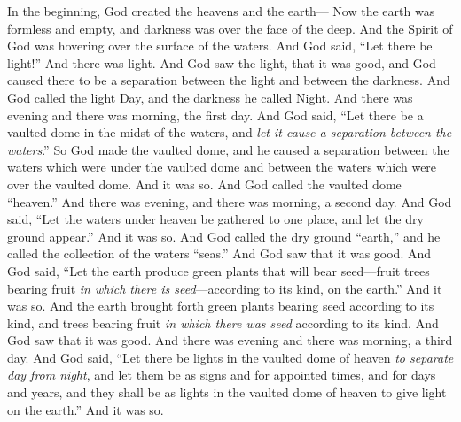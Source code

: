 
\begin{biblechapter} %
 In the beginning, God created the heavens and the earth—
\verse Now the earth was formless and empty, and darkness was over the face of the deep. And the Spirit of God was hovering over the surface of the waters.
\verse And God said, “Let there be light!” And there was light.
\verse And God saw the light, that it was good, and God caused there to be a separation between the light and between the darkness.
\verse And God called the light Day, and the darkness he called Night. And there was evening and there was morning, the first day.
\verse And God said, “Let there be a vaulted dome in the midst of the waters, and \textit{let it cause a separation between the waters}.”
\verse So God made the vaulted dome, and he caused a separation between the waters which were under the vaulted dome and between the waters which were over the vaulted dome. And it was so.
\verse And God called the vaulted dome “heaven.” And there was evening, and there was morning, a second day.
\verse And God said, “Let the waters under heaven be gathered to one place, and let the dry ground appear.” And it was so.
\verse And God called the dry ground “earth,” and he called the collection of the waters “seas.” And God saw that it was good.
\verse And God said, “Let the earth produce green plants that will bear seed—fruit trees bearing fruit \textit{in which there is seed}—according to its kind, on the earth.” And it was so.
\verse And the earth brought forth green plants bearing seed according to its kind, and trees bearing fruit \textit{in which there was seed} according to its kind. And God saw that it was good.
\verse And there was evening and there was morning, a third day.
\verse And God said, “Let there be lights in the vaulted dome of heaven \textit{to separate day from night}, and let them be as signs and for appointed times, and for days and years,
\verse and they shall be as lights in the vaulted dome of heaven to give light on the earth.” And it was so.

\end{biblechapter}
